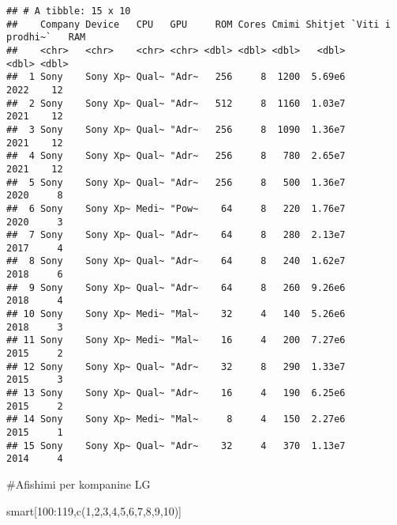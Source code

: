 \documentclass[
]{article}
\newenvironment{Shaded}{\begin{snugshade}}{\end{snugshade}}
\newcommand{\DecValTok}[1]{\textcolor[rgb]{0.00,0.00,0.81}{#1}}
\newcommand{\FunctionTok}[1]{\textcolor[rgb]{0.00,0.00,0.00}{#1}}
\newcommand{\NormalTok}[1]{#1}
\newcommand{\SpecialCharTok}[1]{\textcolor[rgb]{0.00,0.00,0.00}{#1}}
\begin{document}
\begin{verbatim}
## # A tibble: 15 x 10
##    Company Device   CPU   GPU     ROM Cores Cmimi Shitjet `Viti i prodhi~`   RAM
##    <chr>   <chr>    <chr> <chr> <dbl> <dbl> <dbl>   <dbl>            <dbl> <dbl>
##  1 Sony    Sony Xp~ Qual~ "Adr~   256     8  1200  5.69e6             2022    12
##  2 Sony    Sony Xp~ Qual~ "Adr~   512     8  1160  1.03e7             2021    12
##  3 Sony    Sony Xp~ Qual~ "Adr~   256     8  1090  1.36e7             2021    12
##  4 Sony    Sony Xp~ Qual~ "Adr~   256     8   780  2.65e7             2021    12
##  5 Sony    Sony Xp~ Qual~ "Adr~   256     8   500  1.36e7             2020     8
##  6 Sony    Sony Xp~ Medi~ "Pow~    64     8   220  1.76e7             2020     3
##  7 Sony    Sony Xp~ Qual~ "Adr~    64     8   280  2.13e7             2017     4
##  8 Sony    Sony Xp~ Qual~ "Adr~    64     8   240  1.62e7             2018     6
##  9 Sony    Sony Xp~ Qual~ "Adr~    64     8   260  9.26e6             2018     4
## 10 Sony    Sony Xp~ Medi~ "Mal~    32     4   140  5.26e6             2018     3
## 11 Sony    Sony Xp~ Medi~ "Mal~    16     4   200  7.27e6             2015     2
## 12 Sony    Sony Xp~ Qual~ "Adr~    32     8   290  1.33e7             2015     3
## 13 Sony    Sony Xp~ Qual~ "Adr~    16     4   190  6.25e6             2015     2
## 14 Sony    Sony Xp~ Medi~ "Mal~     8     4   150  2.27e6             2015     1
## 15 Sony    Sony Xp~ Qual~ "Adr~    32     4   370  1.13e7             2014     4
\end{verbatim}

\#Afishimi per kompanine LG

\begin{Shaded}
\begin{Highlighting}[]
\NormalTok{smart[}\DecValTok{100}\SpecialCharTok{:}\DecValTok{119}\NormalTok{,}\FunctionTok{c}\NormalTok{(}\DecValTok{1}\NormalTok{,}\DecValTok{2}\NormalTok{,}\DecValTok{3}\NormalTok{,}\DecValTok{4}\NormalTok{,}\DecValTok{5}\NormalTok{,}\DecValTok{6}\NormalTok{,}\DecValTok{7}\NormalTok{,}\DecValTok{8}\NormalTok{,}\DecValTok{9}\NormalTok{,}\DecValTok{10}\NormalTok{)]}
\end{Highlighting}
\end{Shaded}
\end{document}
